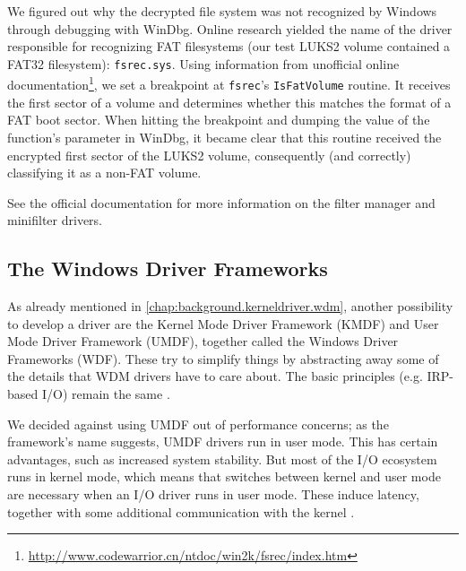 We figured out why the decrypted file system was not recognized by Windows through debugging with WinDbg. Online research yielded the name of the driver responsible for recognizing FAT filesystems (our test LUKS2 volume contained a FAT32 filesystem): \texttt{fsrec.sys}. Using information from unofficial online documentation\footnote{\label{fn:ourapproach.rejected.fsrecdoc} \url{http://www.codewarrior.cn/ntdoc/win2k/fsrec/index.htm}}, we set a breakpoint at \texttt{fsrec}'s \texttt{IsFatVolume} routine. It receives the first sector of a volume and determines whether this matches the format of a FAT boot sector. When hitting the breakpoint and dumping the value of the function's parameter in WinDbg, it became clear that this routine received the encrypted first sector of the LUKS2 volume, consequently (and correctly) classifying it as a non-FAT volume.

See the official documentation \cite{Fltmgr} for more information on the filter manager and minifilter drivers.


\subsection{The Windows Driver Frameworks}
\label{chap:ourapproach.rejected.wdf}
As already mentioned in \autoref{chap:background.kerneldriver.wdm}, another possibility to develop a driver are the Kernel Mode Driver Framework (KMDF) and User Mode Driver Framework (UMDF), together called the Windows Driver Frameworks (WDF). These try to simplify things by abstracting away some of the details that WDM drivers have to care about. The basic principles (e.g. IRP-based I/O) remain the same \cite{Yosifovich2017}.

We decided against using UMDF out of performance concerns; as the framework's name suggests, UMDF drivers run in user mode. This has certain advantages, such as increased system stability. But most of the I/O ecosystem runs in kernel mode, which means that switches between kernel and user mode are necessary when an I/O driver runs in user mode. These induce latency, together with some additional communication with the kernel \cite{Yosifovich2017}.


